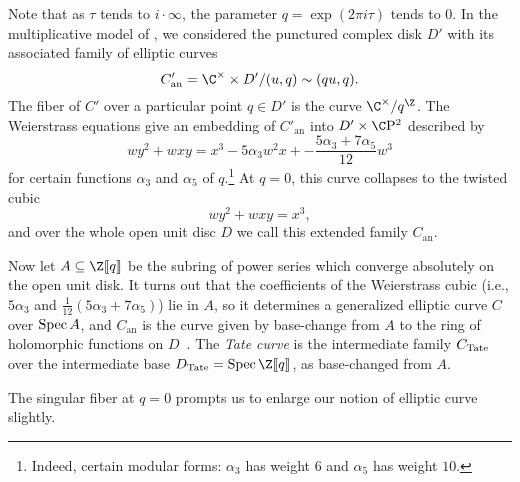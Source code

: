 \begin{definition}
Note that as $\tau$ tends to $i \cdot \infty$, the parameter $q = \exp(2 \pi i \tau)$ tends to $0$.  In the multiplicative model of , we considered the punctured complex disk $D'$ with its associated family of elliptic curves \[C'_{\mathrm{an}} = \C^\times \times D' / (u, q) \sim (qu, q).\]  The fiber of $C'$ over a particular point $q \in D'$ is the curve $\C^\times / q^{\Z}$. %
The Weierstrass equations give an embedding of $C'_{\mathrm{an}}$ into $D' \times \CP^2$ described by \[wy^2 + wxy = x^3 - 5 \alpha_3 w^2 x + -\frac{5 \alpha_3 + 7 \alpha_5}{12}w^3\] for certain functions $\alpha_3$ and $\alpha_5$ of $q$.\footnote{Indeed, certain modular forms: $\alpha_3$ has weight $6$ and $\alpha_5$ has weight $10$.}  At $q = 0$, this curve collapses to the twisted cubic \[wy^2 + wxy = x^3,\] and over the whole open unit disc $D$ we call this extended family $C_{\mathrm{an}}$.

Now let $A \subseteq \Z\ps{q}$ be the subring of power series which converge absolutely on the open unit disk.  It turns out that the coefficients of the Weierstrass cubic (i.e., $5\alpha_3$ and $\frac{1}{12}(5\alpha_3+7\alpha_5)$) lie in $A$, so it determines a generalized elliptic curve $C$ over $\operatorname{Spec} A$, and $C_{\mathrm{an}}$ is the curve given by base-change from $A$ to the ring of holomorphic functions on $D$~\cite[Section 5]{MoravaFormsOfKthy}.  The \textit{Tate curve} is the intermediate family $C_{\mathrm{Tate}}$ over the intermediate base $D_{\Tate} = \Spec \Z\ps{q}$, as base-changed from $A$.
\end{definition}

The singular fiber at $q = 0$ prompts us to enlarge our notion of elliptic curve slightly.


